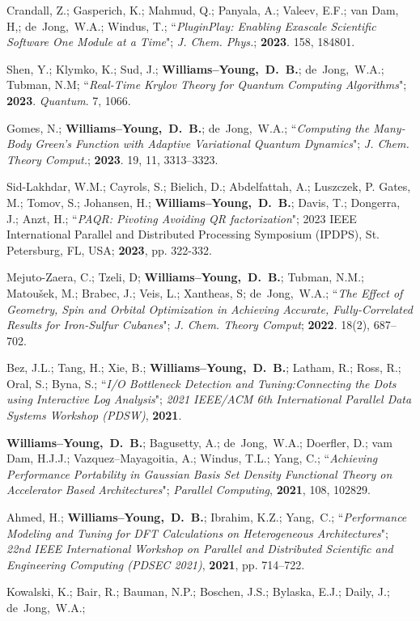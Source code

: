 \documentclass[10pt]{res} %
\newcommand*\me[0]{{\bf Williams--Young,~D.~B.}}
\newcommand*\cy[0]{Yang,~C.}
\newcommand*\bdj[0]{de~Jong,~W.A.}
\begin{document}
\begin{resume}
\begin{etaremune}
        Crandall, Z.; Gasperich, K.; Mahmud, Q.; Panyala, A.; Valeev, E.F.; van Dam, H,; 
        \bdj; Windus, T.;
       ``\emph{PluginPlay: Enabling Exascale Scientific Software One Module at a Time}";
        \emph{J. Chem. Phys.}; \textbf{2023}. 158, 184801. 
  \item Shen, Y.; Klymko, K.; Sud, J.; \me; \bdj; Tubman, N.M;
    ``\emph{Real-Time Krylov Theory for Quantum Computing Algorithms}";
    \textbf{2023}. \emph{Quantum}. 7, 1066.
  \item Gomes, N.; \me;  \bdj;
    ``\emph{Computing the Many-Body Green's Function with Adaptive Variational 
            Quantum Dynamics}";
    \emph{J. Chem. Theory Comput.}; \textbf{2023}. 19, 11, 3313–3323.
  \item Sid-Lakhdar, W.M.; Cayrols, S.; Bielich, D.; Abdelfattah, A.; Luszczek, P.  Gates, M.; Tomov, S.; 
        Johansen, H.; \me; Davis, T.; Dongerra, J.; Anzt, H.; 
        ``\emph{PAQR: Pivoting Avoiding QR factorization}"; 
        2023 IEEE International Parallel and Distributed Processing Symposium (IPDPS), St. Petersburg, FL, USA; \textbf{2023}, pp. 322-332.
  \item Mejuto-Zaera, C.; Tzeli, D; \me; Tubman, N.M.; Matoušek, M.; Brabec, J.; Veis, L.; Xantheas, S; \bdj; 
       ``\emph{The Effect of Geometry, Spin and Orbital Optimization in Achieving Accurate, Fully-Correlated Results for Iron-Sulfur 
                Cubanes}"; \emph{J. Chem. Theory Comput}; \textbf{2022}. 18(2), 687–702.
  \item Bez, J.L.; Tang, H.; Xie, B.; \me; Latham, R.; Ross, R.; Oral, S.; Byna, S.;
        ``\emph{I/O Bottleneck Detection and Tuning:Connecting the Dots using Interactive Log Analysis}";
        \emph{2021 IEEE/ACM 6th International Parallel Data Systems Workshop (PDSW)}, 
        \textbf{2021}.
  \item \me; Bagusetty, A.; \bdj; Doerfler, D.; vam Dam, H.J.J.; Vazquez--Mayagoitia, A.;
        Windus, T.L.; Yang, C.;
        ``\emph{Achieving Performance Portability in Gaussian Basis Set Density Functional Theory 
                on Accelerator Based Architectures}"; \emph{Parallel Computing},
        \textbf{2021}, 108, 102829.
  \item Ahmed, H.; \me; Ibrahim, K.Z.; \cy;
        ``\emph{Performance Modeling and Tuning for DFT Calculations on Heterogeneous Architectures}";
        \emph{22nd IEEE International Workshop on Parallel and Distributed Scientific and Engineering Computing (PDSEC 2021)},
        \textbf{2021}, pp. 714--722.
  \item Kowalski, K.; Bair, R.; Bauman, N.P.; Boschen, J.S.; Bylaska, E.J.; Daily, J.; \bdj; 

\end{etaremune}
\end{resume}
\end{document}
